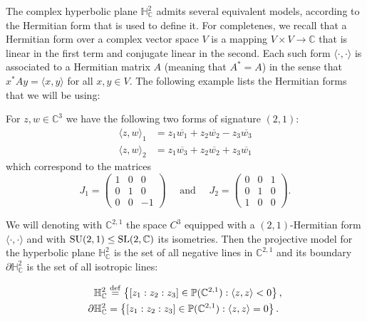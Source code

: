 \documentclass{report}
\begin{document}
The complex hyperbolic plane $\mathbb H^2_{\mathbb C}$ admits several equivalent models, according to the Hermitian form that is used to define it.
For completenes, we recall that a Hermitian form over a complex vector space $V$ is a mapping $V\times V \to \mathbb C$ that is linear in the first term and conjugate linear in the second.
Each such form $\langle \cdot, \cdot \rangle$ is associated to a Hermitian matrix $A$ (meaning that $A^* = A$) in the sense that $x^* A y = \langle x, y \rangle$ for all $x, y \in V$.
The following example lists the Hermitian forms that we will be using:
\begin{example}
    For $z, w \in \mathbb C^3$ we have the following two forms of signature $(2,1)$:
    \begin{align*}
        \langle z, w \rangle_1 &= z_1 \overline{w_1} + z_2 \overline{w_2} - z_3 \overline{w_3}\\
        \langle z, w \rangle_2 &= z_1 \overline{w_3} + z_2 \overline{w_2} + z_3 \overline{w_1}
    \end{align*}
    which correspond to the matrices
    \[
    J_1 = \begin{pmatrix}
        1 & 0 & 0\\
        0 & 1 & 0\\
        0 & 0 & -1
    \end{pmatrix} \quad \text{ and } \quad
    J_2 = \begin{pmatrix}
        0 & 0 & 1\\
        0 & 1 & 0\\
        1 & 0 & 0
    \end{pmatrix}.
    \]
\end{example}

We will denoting with $\mathbb C^{2,1}$ the space $C^3$ equipped with a $(2,1)$-Hermitian form $\langle \cdot, \cdot \rangle$ and with $\operatorname{{\mathrm{SU}}}(2,1) \leq \operatorname{{\mathrm{SL}}}(2, \mathbb C)$ its isometries.
Then the projective model for the hyperbolic plane $\mathbb H^2_{\mathbb C}$ is the set of all negative lines in $\mathbb C^{2,1}$ and its boundary $\partial \mathbb H^2_{\mathbb C}$ is the set of all isotropic lines:

\begin{align*}
    \mathbb H^2_{\mathbb C} &\overset{\mathrm{def}}{=} \left\{ [z_1: z_2: z_3] \in \mathbb P(\mathbb C^{2,1}): \langle z, z \rangle < 0 \right\},\\
    \partial \mathbb H^2_{\mathbb C} &= \left\{ [z_1: z_2: z_3] \in \mathbb P(\mathbb C^{2,1}): \langle z, z \rangle = 0 \right\}.
\end{align*}
\end{document}
